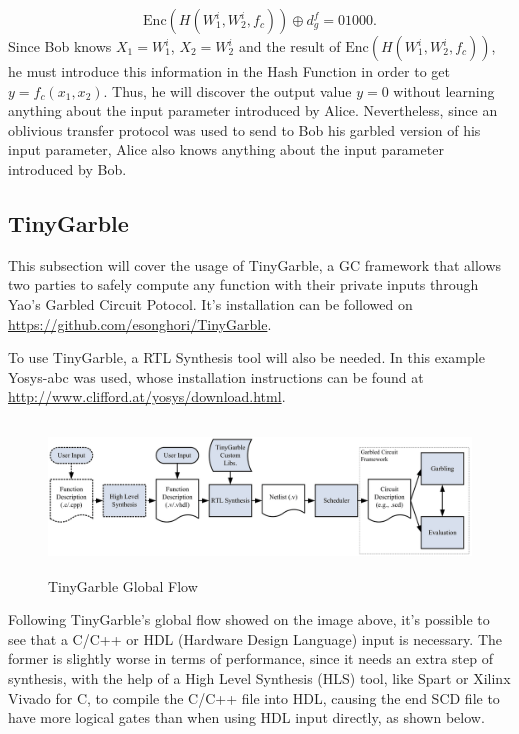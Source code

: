 \begin{refsection}
\begin{equation}\label{eq:decryptiongarbled}
  \textrm{Enc}(H(W_1^i,W_2^i,f_c ))\oplus d_g^f = 0 1 0 0 0.
\end{equation}
Since Bob knows $X_1 = W_1^i$, $X_2=W_2^i$ and the result of $\textrm{Enc}(H(W_1^i,W_2^i,f_c ))$, he must introduce this information in the Hash Function in order to get $y=f_c(x_1,x_2)$. Thus, he will discover the output value $y=0$ without learning anything about the input parameter introduced by Alice. Nevertheless, since an oblivious transfer protocol was used to send to Bob his garbled version of his input parameter, Alice also knows anything about the input parameter introduced by Bob.

\newpage

\subsection{TinyGarble}

This subsection will cover the usage of TinyGarble, a GC framework that allows two parties to safely compute any function with their private inputs through Yao's Garbled Circuit Potocol. It's installation can be followed on \url{https://github.com/esonghori/TinyGarble}.

To use TinyGarble, a RTL Synthesis tool will also be needed. In this example Yosys-abc was used, whose installation instructions can be found at \url{http://www.clifford.at/yosys/download.html}.

\begin{figure}[H]
	\centering
	\includegraphics[width=1\textwidth, height=4cm]{./sdf/secure_multiparty_computation/figures/tiny_garble_flow.png}
    \caption{TinyGarble Global Flow\cite{Songhori}}\label{fig:tinygarble_flow}
\end{figure}

Following TinyGarble's global flow showed on the image above, it's possible to see that a C/C++ or HDL (Hardware Design Language) input is necessary. The former is slightly worse in terms of performance, since it needs an extra step of synthesis, with the help of a  High Level Synthesis (HLS) tool, like Spart or Xilinx Vivado for C, to compile the C/C++ file into HDL, causing the end SCD file to have more logical gates than when using HDL input directly, as shown below. 


\end{refsection}
